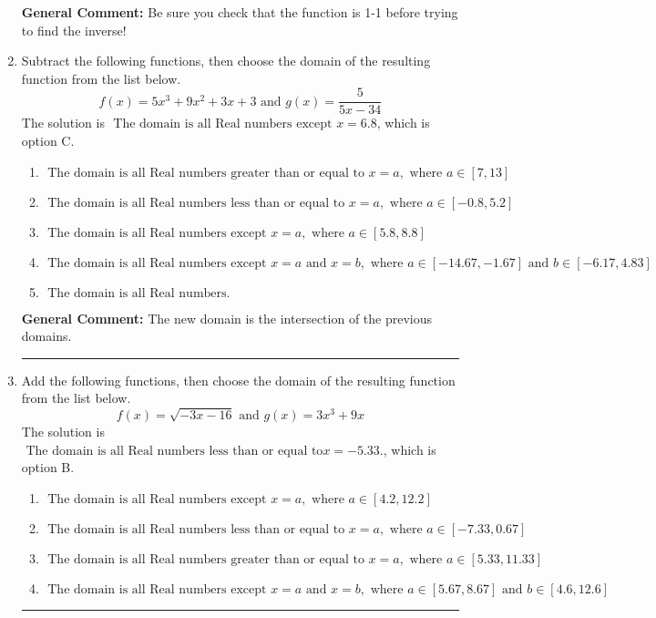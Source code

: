 \documentclass{extbook}[14pt]
\newcommand{\litem}[1]{\item #1

\rule{\textwidth}{0.4pt}}
\begin{document}
\begin{enumerate}
{\textbf{General Comment:} Be sure you check that the function is 1-1 before trying to find the inverse!
}
\litem{
Subtract the following functions, then choose the domain of the resulting function from the list below.
\[ f(x) = 5x^{3} +9 x^{2} +3 x + 3 \text{ and } g(x) = \frac{5}{5x-34} \]The solution is \( \text{ The domain is all Real numbers except } x = 6.8 \), which is option C.\begin{enumerate}[label=\Alph*.]
\item \( \text{ The domain is all Real numbers greater than or equal to } x = a, \text{ where } a \in [7, 13] \)


\item \( \text{ The domain is all Real numbers less than or equal to } x = a, \text{ where } a \in [-0.8, 5.2] \)


\item \( \text{ The domain is all Real numbers except } x = a, \text{ where } a \in [5.8, 8.8] \)


\item \( \text{ The domain is all Real numbers except } x = a \text{ and } x = b, \text{ where } a \in [-14.67, -1.67] \text{ and } b \in [-6.17, 4.83] \)


\item \( \text{ The domain is all Real numbers. } \)


\end{enumerate}

\textbf{General Comment:} The new domain is the intersection of the previous domains.
}
\litem{
Add the following functions, then choose the domain of the resulting function from the list below.
\[ f(x) = \sqrt{-3x-16}  \text{ and } g(x) = 3x^{3} +9 x \]The solution is \( \text{ The domain is all Real numbers less than or equal to} x = -5.33. \), which is option B.\begin{enumerate}[label=\Alph*.]
\item \( \text{ The domain is all Real numbers except } x = a, \text{ where } a \in [4.2, 12.2] \)


\item \( \text{ The domain is all Real numbers less than or equal to } x = a, \text{ where } a \in [-7.33, 0.67] \)


\item \( \text{ The domain is all Real numbers greater than or equal to } x = a, \text{ where } a \in [5.33, 11.33] \)


\item \( \text{ The domain is all Real numbers except } x = a \text{ and } x = b, \text{ where } a \in [5.67, 8.67] \text{ and } b \in [4.6, 12.6] \)



\end{enumerate}}
\end{enumerate}
\end{document}
